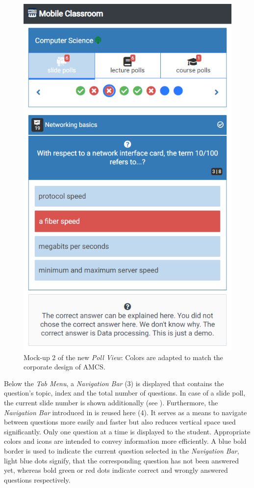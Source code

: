 \begin{figure}[ht]
	\begin{minipage}[t]{\textwidth}
		\centering
		\includegraphics[width=.7\textwidth]{mockups/poll_view_enhancement_v2.png}
		\captionsetup{width=.8\linewidth}
		\caption{Mock-up 2 of the new \emph{Poll View}:
			Colors are adapted to match the corporate design of AMCS.
		}
		\label{figure:pollviewenhanvement2}
	\end{minipage}
\end{figure}
Below the \emph{Tab Menu}, a \emph{Navigation Bar} (3) is displayed that contains the question's topic, index and the total number of questions. In case of a slide poll, the current slide number is shown additionally (see ).
Furthermore, the \emph{Navigation Bar} introduced in  is reused here (4). It serves as a means to navigate between questions more easily and faster but also reduces vertical space used significantly. Only one question at a time is displayed to the student. Appropriate colors and icons are intended to convey information more efficiently. A blue bold border is used to indicate the current question selected in the \emph{Navigation Bar}, light blue dots signify, that the corresponding question has not been answered yet, whereas bold green or red dots indicate correct and wrongly answered questions respectively. 
